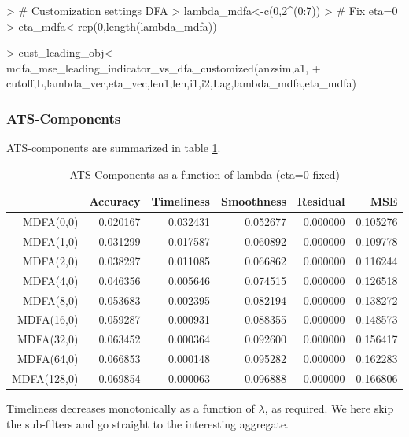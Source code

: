 \documentclass[a4paper]{book}
\begin{document}
\begin{Schunk}
\begin{Sinput}
> # Customization settings DFA
> lambda_mdfa<-c(0,2^(0:7))
> # Fix eta=0
> eta_mdfa<-rep(0,length(lambda_mdfa))
\end{Sinput}
\end{Schunk}
\begin{Schunk}
\begin{Sinput}
> cust_leading_obj<-mdfa_mse_leading_indicator_vs_dfa_customized(anzsim,a1,
+     cutoff,L,lambda_vec,eta_vec,len1,len,i1,i2,Lag,lambda_mdfa,eta_mdfa)  
\end{Sinput}
\end{Schunk}



\subsubsection{ATS-Components}

ATS-components are summarized in table \ref{ats_comp_mdfa_T}.
\begin{table}[ht]
\centering
\begin{tabular}{rrrrrr}
  \hline
 & Accuracy & Timeliness & Smoothness & Residual & MSE \\ 
  \hline
MDFA(0,0) & 0.020167 & 0.032431 & 0.052677 & 0.000000 & 0.105276 \\ 
  MDFA(1,0) & 0.031299 & 0.017587 & 0.060892 & 0.000000 & 0.109778 \\ 
  MDFA(2,0) & 0.038297 & 0.011085 & 0.066862 & 0.000000 & 0.116244 \\ 
  MDFA(4,0) & 0.046356 & 0.005646 & 0.074515 & 0.000000 & 0.126518 \\ 
  MDFA(8,0) & 0.053683 & 0.002395 & 0.082194 & 0.000000 & 0.138272 \\ 
  MDFA(16,0) & 0.059287 & 0.000931 & 0.088355 & 0.000000 & 0.148573 \\ 
  MDFA(32,0) & 0.063452 & 0.000364 & 0.092600 & 0.000000 & 0.156417 \\ 
  MDFA(64,0) & 0.066853 & 0.000148 & 0.095282 & 0.000000 & 0.162283 \\ 
  MDFA(128,0) & 0.069854 & 0.000063 & 0.096888 & 0.000000 & 0.166806 \\ 
   \hline
\end{tabular}
\caption{ATS-Components as a function of lambda (eta=0 fixed)} 
\label{ats_comp_mdfa_T}
\end{table}Timeliness decreases  monotonically as a function of $\lambda$, as required. We here skip the sub-filters and go straight to the interesting aggregate.
\end{document}
